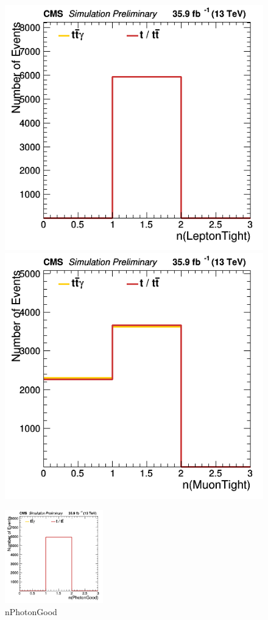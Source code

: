 \documentclass[11pt]{scrartcl}
\begin{document}
	\begin{figure}[H]
	\centering
	\begin{minipage}{.5\textwidth}
	  \centering
	  \includegraphics[width=0.75\linewidth]{figures/Notused/nLeptonTight.png}
	\end{minipage}%
	\begin{minipage}{.5\textwidth}
	  \centering
	  \includegraphics[width=0.75\linewidth]{figures/Notused/nMuonTight.png}
	\end{minipage}
	\end{figure}
	
	\begin{figure}[H]
		\begin{center}
		\includegraphics[width=0.38\textwidth]{figures/Notused/nPhotonGood.png}
		\caption{nPhotonGood}
		\end{center}
	\end{figure}
\end{document}
